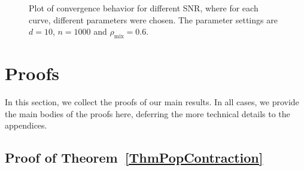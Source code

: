 \documentclass[twoside,11pt]{article}
\newcommand{\mixcoef}{\ensuremath{\rho_{\mathrm{mix}}}}
\newcommand{\paramobs}{\mu}
\newcommand{\trueparamobs}{\ensuremath{\paramobs^*}}
\begin{document}
\begin{figure}[htbp]
\begin{center}
\end{center}
\caption{Plot of convergence behavior for different SNR, where for
  each curve, different parameters were chosen.  The parameter
  settings are $d=10$, $n=1000$ and $\mixcoef = 0.6$.  }
\label{fig:muerror_snr}
\end{figure}




\section{Proofs}
\label{SecProofs}

In this section, we collect the proofs of our main results.  In all
cases, we provide the main bodies of the proofs here, deferring the
more technical details to the appendices.


\subsection{Proof of Theorem~\ref{ThmPopContraction}}
\end{document}
